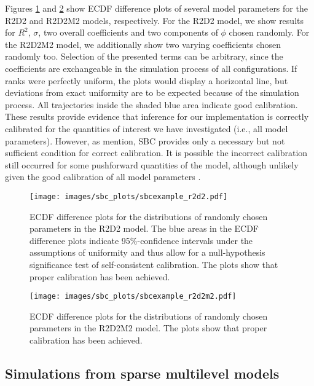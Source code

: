 Figures \ref{fig:sbcresults-r2d2} and \ref{fig:sbcresults-r2d2m2} show ECDF difference plots of several model parameters for the R2D2 and R2D2M2 models, respectively. For the R2D2 model, we show results for $R^2$, $\sigma$, two overall coefficients and two components of $\phi$ chosen randomly. For the R2D2M2 model, we additionally show two varying coefficients chosen randomly too. Selection of the presented terms can be arbitrary, since the coefficients are exchangeable in the simulation process of all configurations. If ranks were perfectly uniform, the plots would display a horizontal line, but deviations from exact uniformity are to be expected because of the simulation process. All trajectories inside the shaded blue area indicate good calibration.
These results provide evidence that inference for our implementation is correctly calibrated for the quantities of interest we have investigated (i.e., all model parameters). However, as \cite{sbcmanual} mention, SBC provides only a necessary but not sufficient condition for correct calibration. It is possible the incorrect calibration still occurred for some pushforward quantities of the model, although unlikely given the good calibration of all model parameters \citep{taltssbc}.
 \begin{figure}[t!]%
	\centering
	\texttt{[image: images/sbc\_plots/sbcexample\_r2d2.pdf]}
	\caption{ECDF difference plots for the distributions of randomly chosen parameters in the R2D2 model. The blue areas in the ECDF difference plots indicate 95\%-confidence intervals under the assumptions of uniformity and thus allow for a null-hypothesis significance test of self-consistent calibration. The plots show that proper calibration has been achieved.}
	\label{fig:sbcresults-r2d2}
\end{figure}
 \begin{figure}[t!]%
	\centering
	\texttt{[image: images/sbc\_plots/sbcexample\_r2d2m2.pdf]}
	\caption{ECDF difference plots for the distributions of randomly chosen parameters in the R2D2M2 model. The plots show that proper calibration has been achieved.}
	\label{fig:sbcresults-r2d2m2}
\end{figure}
\subsection{Simulations from sparse multilevel models}
\label{subsection:GeneralSimMLM}
